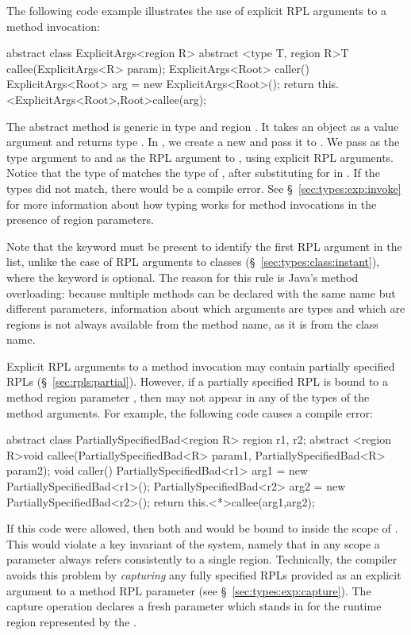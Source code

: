 The following code example illustrates the use of explicit RPL
arguments to a method invocation:
%
\begin{dpjlisting}
abstract class ExplicitArgs<region R> {
    abstract <type T, region R>T callee(ExplicitArgs<R> param);
    ExplicitArgs<Root> caller() {
        ExplicitArgs<Root> arg = new ExplicitArgs<Root>();
        return this.<ExplicitArgs<Root>,Root>callee(arg);
    }
}
\end{dpjlisting}
%
The abstract method  is generic in type  and
region .  It takes an  object as a value
argument and returns type .  In , we create
a new  and pass it to .  We
pass  as the type argument to  and
 as the RPL argument to , using explicit RPL
arguments.  Notice that the type of  matches the type of
, after substituting  for  in .
If the types did not match, there would be a compile error.  See
\S~\ref{sec:types:exp:invoke} for more information about how typing
works for method invocations in the presence of region parameters.

Note that the keyword  must be present to identify the
first RPL argument in the list, unlike the case of RPL arguments to
classes (\S~\ref{sec:types:class:instant}), where the 
keyword is optional.  The reason for this rule is Java's method
overloading: because multiple methods can be declared with the same
name but different parameters, information about which arguments are
types and which are regions is not always available from the method
name, as it is from the class name.

 Explicit RPL
arguments to a method invocation may contain partially specified RPLs
(\S~\ref{sec:rpls:partial}).  However, if a partially specified RPL is
bound to a method region parameter , then  may not
appear in any of the types of the method arguments.  For example, the
following code causes a compile error:
%
\begin{dpjlisting}
abstract class PartiallySpecifiedBad<region R> {
    region r1, r2;
    abstract <region R>void callee(PartiallySpecifiedBad<R> param1,
                                          PartiallySpecifiedBad<R> param2);
    void caller() {
        PartiallySpecifiedBad<r1> arg1 = new PartiallySpecifiedBad<r1>();
        PartiallySpecifiedBad<r2> arg2 = new PartiallySpecifiedBad<r2>();
        return this.<*>callee(arg1,arg2);
    }
}
\end{dpjlisting}
%
If this code were allowed, then both  and  would be
bound to  inside the scope of .  This would violate
a key invariant of the system, namely that in any scope a parameter
 always refers consistently to a single region.  Technically,
the compiler avoids this problem by \emph{capturing} any fully
specified RPLs provided as an explicit argument to a method RPL
parameter (see \S~\ref{sec:types:exp:capture}).  The capture operation
declares a fresh parameter which stands in for the runtime region
represented by the \kwd{*}.

